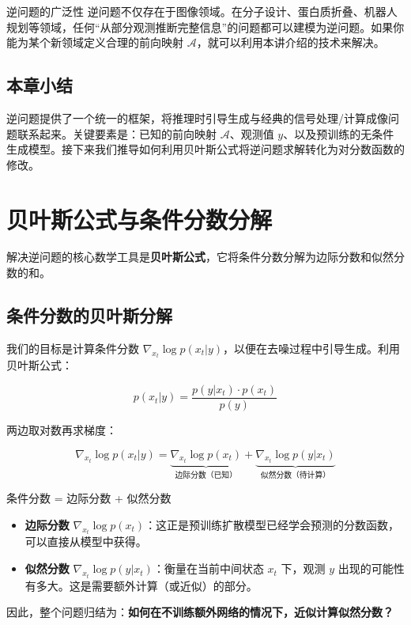 \documentclass[a4paper]{article}
\begin{document}
\begin{knowledgebox}{逆问题的广泛性}
逆问题不仅存在于图像领域。在分子设计、蛋白质折叠、机器人规划等领域，任何``从部分观测推断完整信息''的问题都可以建模为逆问题。如果你能为某个新领域定义合理的前向映射 $\mathcal{A}$，就可以利用本讲介绍的技术来解决。
\end{knowledgebox}

\subsection{本章小结}

逆问题提供了一个统一的框架，将推理时引导生成与经典的信号处理/计算成像问题联系起来。关键要素是：已知的前向映射 $\mathcal{A}$、观测值 $y$、以及预训练的无条件生成模型。接下来我们推导如何利用贝叶斯公式将逆问题求解转化为对分数函数的修改。


\section{贝叶斯公式与条件分数分解}

解决逆问题的核心数学工具是\textbf{贝叶斯公式}，它将条件分数分解为边际分数和似然分数的和。

\subsection{条件分数的贝叶斯分解}

我们的目标是计算条件分数 $\nabla_{x_t} \log p(x_t | y)$，以便在去噪过程中引导生成。利用贝叶斯公式：

$$
p(x_t | y) = \frac{p(y | x_t) \cdot p(x_t)}{p(y)}
$$

两边取对数再求梯度：

$$
\nabla_{x_t} \log p(x_t | y) = \underbrace{\nabla_{x_t} \log p(x_t)}_{\text{边际分数（已知）}} + \underbrace{\nabla_{x_t} \log p(y | x_t)}_{\text{似然分数（待计算）}}
$$

\begin{importantbox}{条件分数 = 边际分数 + 似然分数}
\begin{itemize}
    \item \textbf{边际分数} $\nabla_{x_t} \log p(x_t)$：这正是预训练扩散模型已经学会预测的分数函数，可以直接从模型中获得。
    \item \textbf{似然分数} $\nabla_{x_t} \log p(y | x_t)$：衡量在当前中间状态 $x_t$ 下，观测 $y$ 出现的可能性有多大。这是需要额外计算（或近似）的部分。
\end{itemize}
因此，整个问题归结为：\textbf{如何在不训练额外网络的情况下，近似计算似然分数？}
\end{importantbox}
\end{document}
